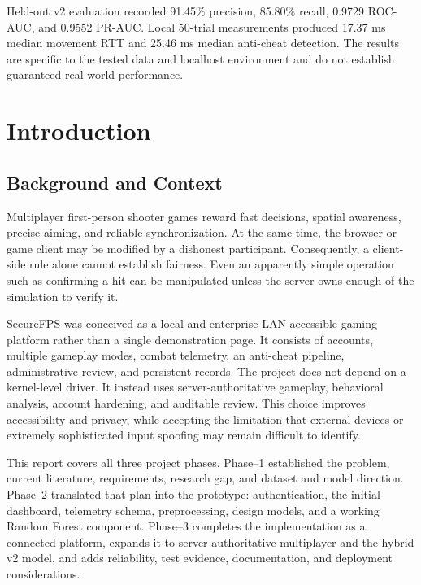 \documentclass[12pt,a4paper,oneside]{report}
\begin{document}
Held-out v2 evaluation recorded 91.45\% precision, 85.80\% recall, 0.9729 ROC-AUC, and 0.9552 PR-AUC. Local 50-trial measurements produced 17.37 ms median movement RTT and 25.46 ms median anti-cheat detection. The results are specific to the tested data and localhost environment and do not establish guaranteed real-world performance.

\clearpage
\tableofcontents
\clearpage
\listoftables
\clearpage
\listoffigures
\clearpage
{}

\chapter{Introduction}
\section{Background and Context}
Multiplayer first-person shooter games reward fast decisions, spatial awareness, precise aiming, and reliable synchronization. At the same time, the browser or game client may be modified by a dishonest participant. Consequently, a client-side rule alone cannot establish fairness. Even an apparently simple operation such as confirming a hit can be manipulated unless the server owns enough of the simulation to verify it.

SecureFPS was conceived as a local and enterprise-LAN accessible gaming platform rather than a single demonstration page. It consists of accounts, multiple gameplay modes, combat telemetry, an anti-cheat pipeline, administrative review, and persistent records. The project does not depend on a kernel-level driver. It instead uses server-authoritative gameplay, behavioral analysis, account hardening, and auditable review. This choice improves accessibility and privacy, while accepting the limitation that external devices or extremely sophisticated input spoofing may remain difficult to identify.

This report covers all three project phases. Phase--1 established the problem, current literature, requirements, research gap, and dataset and model direction. Phase--2 translated that plan into the prototype: authentication, the initial dashboard, telemetry schema, preprocessing, design models, and a working Random Forest component. Phase--3 completes the implementation as a connected platform, expands it to server-authoritative multiplayer and the hybrid v2 model, and adds reliability, test evidence, documentation, and deployment considerations.
\end{document}
